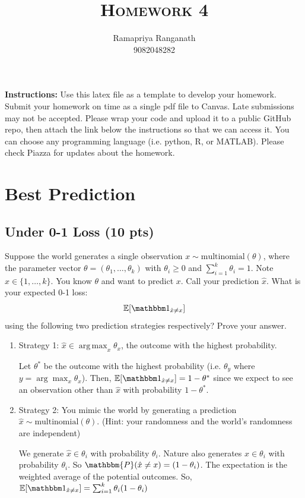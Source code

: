 \documentclass[a4paper]{article}
\title{\textsc{Homework 4}} %
\author{
Ramapriya Ranganath \\
9082048282\\
}
\date{}
\theoremstyle{definition}
\DeclareMathOperator*{\argmax}{arg\,max}
\def\E{\mathbb E}
\def\ind{\mathbbm 1}
\newenvironment{soln}{
    \leavevmode\color{blue}\ignorespaces
}{}
\begin{document}
\maketitle 


\textbf{Instructions:} Use this latex file as a template to develop your homework. Submit your homework on time as a single pdf file to Canvas. Late submissions may not be accepted. Please wrap your code and upload it to a public GitHub repo, then attach the link below the instructions so that we can access it. You can choose any programming language (i.e. python, R, or MATLAB). Please check Piazza for updates about the homework. \\


\section{Best Prediction}
\subsection{Under 0-1 Loss (10 pts)}
Suppose the world generates a single observation $x \sim \mbox{multinomial}(\theta)$, where the parameter vector $\theta=(\theta_1, \ldots, \theta_k)$ with $\theta_i\ge 0$ and $\sum_{i=1}^k \theta_i=1$.  Note $x \in \{1, \ldots, k\}$.
You know $\theta$ and want to predict $x$. 
Call your prediction $\hat x$.  What is your expected 0-1 loss: 
$$\E[\ind_{\hat x \neq x}]$$
using the following two prediction strategies respectively?  Prove your answer.
\begin{enumerate}
    \item Strategy 1: $\hat x \in \argmax_x \theta_x$, the outcome with the highest probability.
    
    \begin{soln}
        Let $\theta^{*}$ be the outcome with the highest probability (i.e. $\theta_{y}$ where $y = \arg \max_{x} \theta_{x}$). 
        Then, $\E[\ind_{\hat x \neq x}] = 1 - \theta^{*}$ since we expect to see an observation other than $\hat{x}$ with probability $1 - \theta^{*}$.
    \end{soln}

    \item Strategy 2: You mimic the world by generating a prediction $\hat x \sim \mbox{multinomial}(\theta)$.  (Hint: your randomness and the world's randomness are independent)
    
    \begin{soln}
        We generate $\hat x \in \theta_{i}$ with probability $\theta_{i}$.
        Nature also generates $x \in \theta_{i}$ with probability $\theta_{i}$.
        So $\mathbbm{P}(\hat x \neq x) = (1-\theta_{i})$.
        The expectation is the weighted average of the potential outcomes.
        So, $\E[\ind_{\hat x \neq x}] = \sum_{i = 1}^{k} \theta_{i} (1-\theta_{i})$
    \end{soln}

\end{enumerate}
\end{document}
